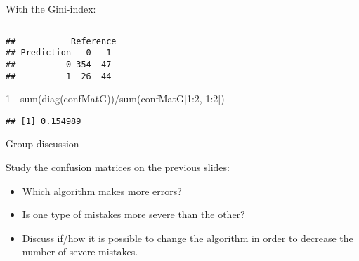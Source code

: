 \documentclass[
  10pt,
  ignorenonframetext,
]{beamer}
\newenvironment{Shaded}{\begin{snugshade}}{\end{snugshade}}
\newcommand{\AttributeTok}[1]{\textcolor[rgb]{0.77,0.63,0.00}{#1}}
\newcommand{\DecValTok}[1]{\textcolor[rgb]{0.00,0.00,0.81}{#1}}
\newcommand{\FunctionTok}[1]{\textcolor[rgb]{0.00,0.00,0.00}{#1}}
\newcommand{\NormalTok}[1]{#1}
\newcommand{\OtherTok}[1]{\textcolor[rgb]{0.56,0.35,0.01}{#1}}
\newcommand{\SpecialCharTok}[1]{\textcolor[rgb]{0.00,0.00,0.00}{#1}}
\newcommand{\StringTok}[1]{\textcolor[rgb]{0.31,0.60,0.02}{#1}}
\begin{document}
\begin{frame}[fragile]
\normalsize

With the Gini-index:

\(~\)

\tiny

\begin{Shaded}
\end{Shaded}

\begin{verbatim}
##           Reference
## Prediction   0   1
##          0 354  47
##          1  26  44
\end{verbatim}

\begin{Shaded}
\begin{Highlighting}[]
\DecValTok{1} \SpecialCharTok{{-}} \FunctionTok{sum}\NormalTok{(}\FunctionTok{diag}\NormalTok{(confMatG))}\SpecialCharTok{/}\FunctionTok{sum}\NormalTok{(confMatG[}\DecValTok{1}\SpecialCharTok{:}\DecValTok{2}\NormalTok{, }\DecValTok{1}\SpecialCharTok{:}\DecValTok{2}\NormalTok{])}
\end{Highlighting}
\end{Shaded}

\begin{verbatim}
## [1] 0.154989
\end{verbatim}
\end{frame}

\begin{frame}
\begin{block}{Group discussion}
\protect\hypertarget{group-discussion}{}
\(~\)

Study the confusion matrices on the previous slides:

\vspace{2mm}

\begin{itemize}
\item
  Which algorithm makes more errors?
\item
  Is one type of mistakes more severe than the other?
\item
  Discuss if/how it is possible to change the algorithm in order to
  decrease the number of severe mistakes.
\end{itemize}
\end{block}
\end{frame}
\end{document}
